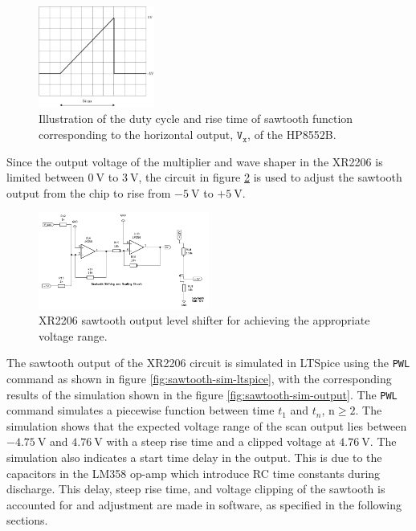 \documentclass[class=report,11pt,crop=false]{standalone}
\begin{document}
	\begin{figure}[ht!]
		\centering
		\includegraphics[width=0.34\textwidth]{Figures/Methodology/hp8552b-sawtooth}
		\caption{Illustration of the duty cycle and rise time of sawtooth function corresponding to the horizontal output, $\texttt{V}_\texttt{x}$, of the HP8552B.}
		\label{fig:hp8552b-sawtooth}
	\end{figure}
	
	Since the output voltage of the multiplier and wave shaper in the XR2206 is limited between $\SI{0}{\volt}$ to $\SI{3}{\volt}$, the circuit in figure \ref{fig:emulator-circuit-level-shift} is used to adjust the sawtooth output from the chip to rise from $-\SI{5}{\volt}$ to $+\SI{5}{\volt}$.
	
	\begin{figure}[ht!]
		\centering
		\includegraphics[width=0.50\textwidth]{Figures/Methodology/hp8552b-horizontal-output-level-shifter-3}
		\caption{XR2206 sawtooth output level shifter for achieving the appropriate voltage range.}
		\label{fig:emulator-circuit-level-shift}
	\end{figure}
	The sawtooth output of the XR2206 circuit is simulated in LTSpice using the \texttt{PWL} command as shown in figure \ref{fig:sawtooth-sim-ltspice}, with the corresponding results of the simulation shown in the figure \ref{fig:sawtooth-sim-output}. The \texttt{PWL} command simulates a piecewise function between time $t_1$ and $t_n$, $\text{n}\geq 2$. The simulation shows that the expected voltage range of the scan output lies between $-\SI{4.75}{\volt}$ and $\SI{4.76}{\volt}$ with a steep rise time and a clipped voltage at $\SI{4.76}{\volt}$. The simulation also indicates a start time delay in the output. This is due to the capacitors in the LM358 op-amp which introduce RC time constants during discharge. This delay, steep rise time, and voltage clipping of the sawtooth is accounted for and adjustment are made in software, as specified in the following sections. 
	
\end{document}
